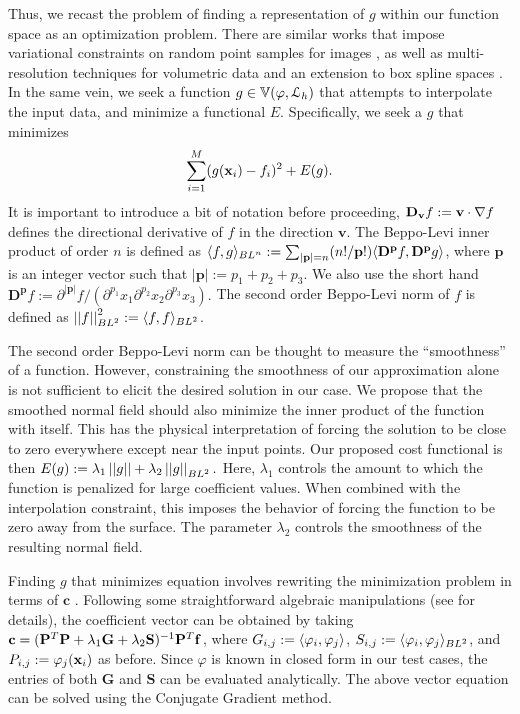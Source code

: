 Thus, we recast the problem of finding a representation of $g$ within our function space as an optimization problem. There are similar works that impose variational constraints on random point samples for images \cite{variational}, as well as multi-resolution techniques for volumetric data \cite{onvari} and an extension to box spline spaces \cite{xu2012rec}. In the same vein, we seek a function $g \in \aspace{\lattice{L}_h}{\varphi}$ that attempts to interpolate the input data, and minimize a functional $E$. Specifically, we seek a $g$ that minimizes {\small 
\begin{equation} \label{eq:minexp}
 	\sump_{i=1}^{M} (g(\vx_i) -  f_i)^2 + E(g).
\end{equation}}
It is important to introduce a bit of notation before proceeding, $\dv{\mathbf{v}} f := \mathbf{v} \cdot \grad f$ defines the directional derivative of $f$ in the direction $\mathbf{v}$. The Beppo-Levi inner product of order $n$ is defined as $\blip{n}{f}{g}:= \sum_{|\mathbf{p}|=n}({n!}/{\mathbf{p}!}) \innerp{\mathbf{D^p}f}{\mathbf{D^p}g}$, where $\mathbf{p}$ is an integer vector such that $\left| \mathbf{p}\right| := p_1 + p_2 + p_3 $. We also use the short hand $\mathbf{D^p}f := \partial^{\left| \mathbf{p}\right|}f/({\partial^{p_1}x_1}{\partial^{p_2}x_2}{\partial^{p_3}x_3}).$ The second order Beppo-Levi norm of $f$ is defined as $\bln{2}{f}^2:=\blip{2}{f}{f}$.

The second order Beppo-Levi norm can be thought to measure the ``smoothness'' of a function. However, constraining the smoothness of our approximation alone is not sufficient to elicit the desired solution in our case. We propose that the smoothed normal field should also minimize the inner product of the function with itself. This has the physical interpretation of forcing the solution to be close to zero everywhere except near the input points. Our proposed cost functional is then $E(g) := \lambda_1 \left|\left|{g}\right|\right| + \lambda_2 \bln{2}{g}.$ Here, $\lambda_1$ controls the amount to which the function is penalized for large coefficient values. When combined with the interpolation constraint, this imposes the behavior of forcing the function to be zero away from the surface. The parameter $\lambda_2$ controls the smoothness of the resulting normal field.

Finding $g$ that minimizes equation  involves rewriting the minimization problem in terms of $\mathbf{c}$ \cite{xu2012rec}. Following some straightforward algebraic manipulations (see \cite{xu2012rec} for details), the coefficient vector can be obtained by taking $\mathbf{c} = ( \mathbf{\Phii}^T\mathbf{\Phii} + \lambda_1\mathbf{G} + \lambda_2\mathbf{S})^{-1}\mathbf{\Phii}^T\mathbf{f}$, where $G_{i,j}:=\innerp{\varphi_i}{\varphi_j}$, $S_{i,j}:=\blip{2}{\varphi_i}{\varphi_j}$, and $P_{i,j} := \varphi_j(\vx_i)$ as before. Since $\varphi$ is known in closed form in our test cases, the entries of both $\mathbf{G}$ and $\mathbf{S}$ can be evaluated analytically. The above vector equation can be solved using the Conjugate Gradient method.
